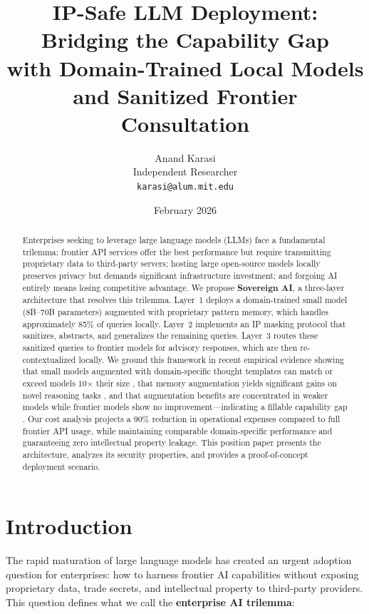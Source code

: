 \documentclass[11pt,a4paper]{article}
\title{\textbf{IP-Safe LLM Deployment: Bridging the Capability Gap\\with Domain-Trained Local Models\\and Sanitized Frontier Consultation}}
\author{
Anand Karasi\\
Independent Researcher\\
\texttt{karasi@alum.mit.edu}
}
\date{February 2026}
\begin{document}
\maketitle

\begin{abstract}
Enterprises seeking to leverage large language models (LLMs) face a fundamental trilemma: frontier API services offer the best performance but require transmitting proprietary data to third-party servers; hosting large open-source models locally preserves privacy but demands significant infrastructure investment; and forgoing AI entirely means losing competitive advantage. We propose \textbf{Sovereign AI}, a three-layer architecture that resolves this trilemma. Layer~1 deploys a domain-trained small model (8B--70B parameters) augmented with proprietary pattern memory, which handles approximately 85\% of queries locally. Layer~2 implements an IP masking protocol that sanitizes, abstracts, and generalizes the remaining queries. Layer~3 routes these sanitized queries to frontier models for advisory responses, which are then re-contextualized locally. We ground this framework in recent empirical evidence showing that small models augmented with domain-specific thought templates can match or exceed models 10$\times$ their size \citep{yang2024bot}, that memory augmentation yields significant gains on novel reasoning tasks \citep{ho2025arcmemo}, and that augmentation benefits are concentrated in weaker models while frontier models show no improvement---indicating a fillable capability gap \citep{karasi2026experience}. Our cost analysis projects a 90\% reduction in operational expenses compared to full frontier API usage, while maintaining comparable domain-specific performance and guaranteeing zero intellectual property leakage. This position paper presents the architecture, analyzes its security properties, and provides a proof-of-concept deployment scenario.
\end{abstract}

\section{Introduction}
\label{sec:intro}

The rapid maturation of large language models has created an urgent adoption question for enterprises: how to harness frontier AI capabilities without exposing proprietary data, trade secrets, and intellectual property to third-party providers. This question defines what we call the \textbf{enterprise AI trilemma}:
\end{document}
